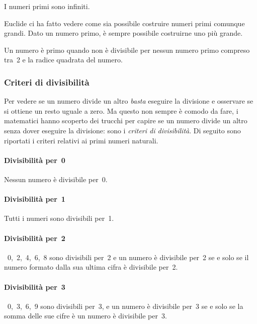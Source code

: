 \begin{teorema}[di Euclide]
I numeri primi sono infiniti.
\end{teorema}

Euclide ci ha fatto vedere come sia possibile costruire numeri primi 
comunque 
grandi. Dato un numero primo, è sempre possibile costruirne uno più grande.


\osservazione Un numero è primo quando non è divisibile per nessun numero 
primo compreso tra~2 e la radice quadrata del numero.

\subsubsection{Criteri di divisibilità}
\label{sec:01_divisibilita}

Per vedere se un numero divide un altro \emph{basta} eseguire la 
divisione e osservare se si ottiene un resto uguale a zero. 
Ma questo non sempre è comodo da fare, i matematici hanno scoperto dei
trucchi per capire se un numero divide un altro senza dover eseguire 
la divisione: sono i \emph{criteri di divisibilità}. 
Di seguito sono riportati i criteri relativi ai primi numeri naturali.

\paragraph{Divisibilità per~0} Nessun numero è divisibile per~0.

\paragraph{Divisibilità per~1} Tutti i numeri sono divisibili per~1.

\paragraph{Divisibilità per~2}~0,~2,~4,~6,~8 sono divisibili per~2 
e un numero è divisibile per~2 se e solo se il numero formato dalla sua 
ultima cifra è divisibile per~2.

\paragraph{Divisibilità per~3}~0,~3,~6,~9 sono divisibili per~3,
e un numero è divisibile per~3 se e solo se la somma delle sue cifre è un 
numero è divisibile per~3.

